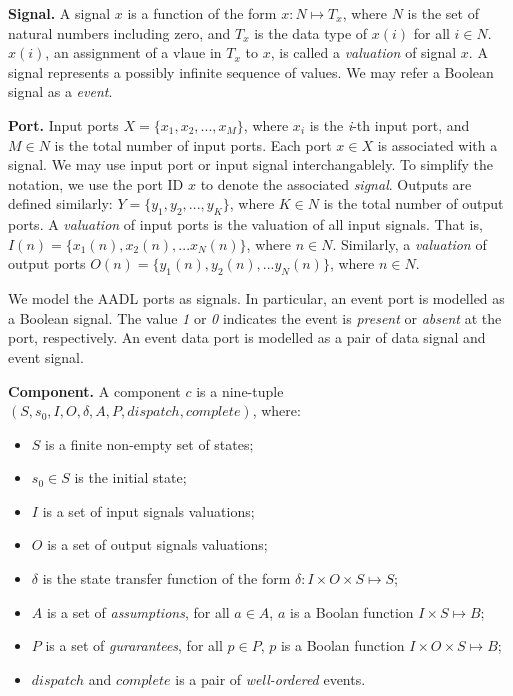 {\bf Signal.}
A signal $x$ is a function of the form $x: N \mapsto T_x$, where $N$ is the set of natural numbers including zero, and $T_x$ is the data type of $x(i)$ for all $i \in N$.
$x(i)$, an assignment of a vlaue in $T_x$ to $x$, is called a \emph{valuation} of signal $x$. A signal represents a possibly infinite sequence of values. We may refer a Boolean signal as a \emph{event}.

{\bf Port.}
Input ports $X = \{x_1, x_2, ..., x_M\}$, where $x_i$ is the \emph{i}-th input port, and $M\in N$ is the total number of input ports. Each port $x \in X$ is associated with a signal. We may use input port or input signal interchangablely. To simplify the notation, we use the port ID $x$ to denote the associated \emph{signal}. Outputs are defined similarly: $Y = \{y_1, y_2, ..., y_K\}$, where $K\in N$ is the total number of output ports.  
A \emph{valuation} of input ports is the valuation of all input signals. That is, $I(n) = \{x_1(n), x_2(n), ... x_N(n)\}$, where $n \in N$. Similarly, a \emph{valuation} of output ports $O(n) = \{y_1(n), y_2(n), ... y_N(n)\}$, where $n \in N$. 

We model the AADL ports as signals. In particular, an event port is modelled as a Boolean signal. The value \emph{1} or \emph{0} indicates the event is \emph{present} or \emph{absent} at the port, respectively. 
An event data port is modelled as a pair of data signal and event signal.  %

{\bf Component.}
A component $c$ is a nine-tuple $(S, s_0, I, O, \delta, A, P, dispatch, complete)$, where: 
\begin{itemize}
    	\item $S$ is a finite non-empty set of states;
    	\item $s_0 \in S$ is the initial state;
    	\item $I$ is a set of input signals valuations;
    	\item $O$ is a set of output signals valuations;
    	\item $\delta$ is the state transfer function of the form $\delta: I \times O \times S \mapsto S$;
    	\item $A$ is a set of \emph{assumptions}, for all $a \in A$, $a$ is a Boolan function $I \times S \mapsto B$;
    	\item $P$ is a set of \emph{gurarantees}, for all $p \in P$, $p$ is a Boolan function $I \times O \times S \mapsto B$;
    	\item $dispatch$ and $complete$ is a pair of \emph{well-ordered} events.
\end{itemize}

